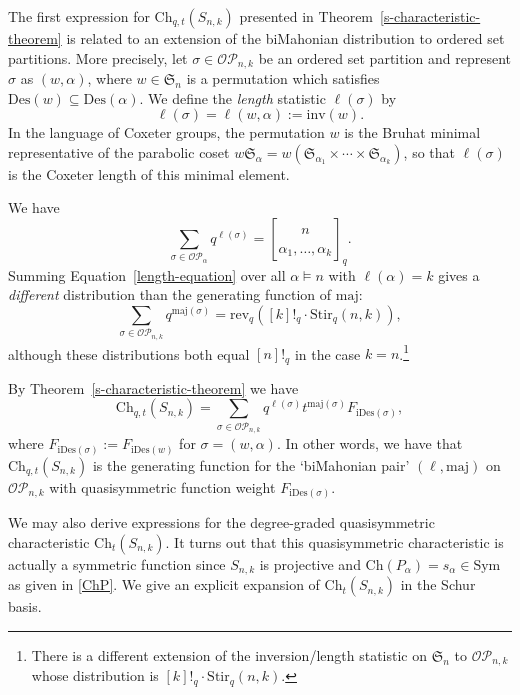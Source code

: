 \documentclass[ALCO,ThmDefs,published]{cedram}
\newcommand{\symm}{{\mathfrak{S}}}
\theoremstyle{plain}
\newcommand{\maj}{{\mathrm {maj}}}
\newcommand{\inv}{{\mathrm {inv}}}
\newcommand{\Des}{{\mathrm {Des}}}
\newcommand{\Stir}{{\mathrm {Stir}}}
\newcommand{\rev}{{\mathrm {rev}}}
\newcommand{\Sym}{{\mathrm {Sym}}}
\newcommand{\Ch}{{\mathrm {Ch}}}
\newcommand{\iDes}{{\mathrm {iDes}}}
\newcommand{\symm}{{\mathfrak{S}}}
\newcommand{\OP}{{\mathcal{OP}}}
\begin{document}
The first expression for $\Ch_{q,t}(S_{n,k})$ presented in Theorem~\ref{s-characteristic-theorem} is related
to an extension of the biMahonian distribution to ordered set partitions.  More precisely, let 
$\sigma \in \OP_{n,k}$ be an ordered set partition and represent $\sigma$ as $(w, \alpha)$, where
$w \in \symm_n$ is a permutation which satisfies $\Des(w) \subseteq \Des(\alpha)$.
We define the \emph{length} statistic $\ell(\sigma)$ by
\begin{equation}
\ell(\sigma) = \ell(w,\alpha) := \inv(w).
\end{equation}
In the language of Coxeter groups, the permutation $w$ is the Bruhat minimal representative of the parabolic
coset $w \symm_{\alpha} = w (\symm_{\alpha_1} \times \cdots \times \symm_{\alpha_k})$, so that $\ell(\sigma)$
is the Coxeter length of this minimal element.  




We have
\begin{equation}
\label{length-equation}
\sum_{\sigma \in \OP_{\alpha}} q^{\ell(\sigma)} = {n \brack \alpha_1, \dots, \alpha_k}_q.
\end{equation}
Summing Equation~\eqref{length-equation} over all $\alpha \models n$ with $\ell(\alpha) = k$
gives a \emph{different} distribution than the generating function of $\maj$:
\begin{equation}
\label{maj-equation}
\sum_{\sigma \in \OP_{n,k}} q^{\maj(\sigma)} = \rev_q([k]!_q \cdot \Stir_q(n,k)),
\end{equation}
although these distributions both equal $[n]!_q$ in the case $k = n$.\footnote{There is a different extension of the inversion/length statistic
on $\symm_n$ to $\OP_{n,k}$   \cite{RW, WMultiset, Rhoades, HRW, HRS} whose distribution is
$[k]!_q \cdot \Stir_q(n,k)$.}


By Theorem~\ref{s-characteristic-theorem} we have
\begin{equation}
\Ch_{q,t}(S_{n,k}) = \sum_{\sigma \in \OP_{n,k}} 
q^{\ell(\sigma)} t^{\maj(\sigma)} F_{\iDes(\sigma)},
\end{equation}
where $F_{\iDes(\sigma)} := F_{\iDes(w)}$ for $\sigma = (w, \alpha)$.
In other words, we have that $\Ch_{q,t}(S_{n,k})$ is the generating function
for the `biMahonian pair' $(\ell, \maj)$ on $\OP_{n,k}$ with quasisymmetric function weight $F_{\iDes(\sigma)}$.


We may also derive expressions for the degree-graded quasisymmetric characteristic $\Ch_t(S_{n,k})$.
It turns out that this quasisymmetric characteristic is actually a symmetric function  since $S_{n,k}$ is projective and $\Ch(P_\alpha) = s_\alpha \in\Sym$ as given in \eqref{ChP}.
We give an explicit expansion of $\Ch_t(S_{n,k})$ in the Schur basis.
\end{document}
